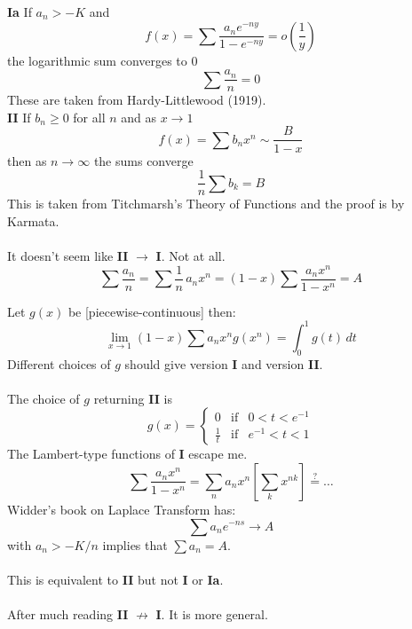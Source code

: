 \documentclass[12pt]{article}
\begin{document}
\newpage 

\noindent \textbf{Ia} If $a_n > -K$ and 
$$ f(x)= \sum \frac{a_n e^{-ny}}{1 - e^{-ny}} = o(\frac{1}{y})$$
the logarithmic sum converges to $0$
$$ \sum \frac{a_n}{n} = 0$$
These are taken from Hardy-Littlewood (1919). \\ 

\noindent \textbf{II} If $b_n \geq 0$ for all $n$ and as $x \to 1$ 
$$ f(x) = \sum b_n x^n \sim \frac{B}{1-x}$$
then as $n \to \infty$ the sums converge 
$$ \frac{1}{n} \sum b_k = B $$
This is taken from Titchmarsh's Theory of Functions and the proof is by Karmata. \\\\
It doesn't seem like \textbf{II} $\to$ \textbf{I}.  Not at all.
$$ \sum \frac{a_n}{n} =
\sum \frac{1}{n} \, a_n x^n
 =  (1-x)\sum \frac{a_n x^n}{1-x^n}
= A  $$

\newpage

\noindent Let $g(x)$ be [piecewise-continuous] then:
$$ \lim_{x \to 1} (1-x)\sum a_n x^n g(x^n) = \int_0^1 g(t) \, dt $$
Different choices of $g$ should give version \textbf{I} and version \textbf{II}. \\ \\
The choice of $g$ returning \textbf{II} is
$$ g(x) 
= \left\{ 
\begin{array}{ccc} 
0 & \text{if} & 0 < t < e^{-1} \\
\frac{1}{t} &  \text{if} & e^{-1} < t < 1
\end{array}
\right.$$
The Lambert-type functions of \textbf{I} escape me.
$$ \sum \frac{a_n x^n}{1-x^n}
= \sum_n a_n x^n \left[ \sum_k x^{nk}\right] \stackrel{?}{=} \dots $$
Widder's book on Laplace Transform has:
$$ \sum a_n e^{-ns} \to A  $$
with $a_n > - K/n$ implies that $\sum a_n = A$. \\ \\
This is equivalent to \textbf{II} but not \textbf{I} or \textbf{Ia}.  \\ \\
After much reading \textbf{II} $\not \longrightarrow $ \textbf{I}.  It is more general.
\end{document}
